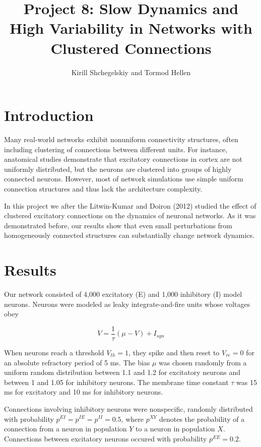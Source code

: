 \documentclass[11pt]{article}
\begin{document}
\title{Project 8: Slow Dynamics and High Variability in Networks with Clustered Connections}
\author{Kirill Shchegelskiy and Tormod Hellen}

\maketitle

\section{Introduction}

Many real-world networks exhibit nonuniform connectivity structures, often including clustering of connections between different units. For instance, anatomical studies demonstrate that excitatory connections in cortex are not uniformly distributed, but the neurons are clustered into groups of highly connected neurons. However, most of network simulations use simple uniform connection structures and thus lack the architecture complexity.

In this project we after the Litwin-Kumar and Doiron (2012) studied the effect of clustered excitatory connections on the dynamics of neuronal networks. As it was demonstrated before, our results show that even small perturbations from homogeneously connected structures can substantially change network dynamics. 

\section{Results}

Our network consisted of 4,000 excitatory (E) and 1,000 inhibitory (I) model neurons. Neurons were modeled as leaky integrate-and-fire units whose voltages obey 

$$
\dot{V} = \frac{1}{\tau}(\mu - V) + I_{syn}
$$

When neurons reach a threshold $V_{th} = 1$, they spike and then reset to $V_{re} = 0$ for an absolute refractory period of 5 ms. The bias $\mu$ was chosen randomly from a uniform random distribution between 1.1 and 1.2 for excitatory neurons and between 1 and 1.05 for inhibitory neurons. The membrane time constant $\tau$ was 15 ms for excitatory and 10 ms for inhibitory neurons.

Connections involving inhibitory neurons were nonspecific, randomly distributed with probability $p^{EI} = p^{IE} = p^{II} = 0.5$, where $p^{XY}$ denotes the probability of a connection from a neuron in population $Y$ to a neuron in population $X$. Connections between excitatory neurons occured with probability $p^{EE} = 0.2$.
\end{document}
